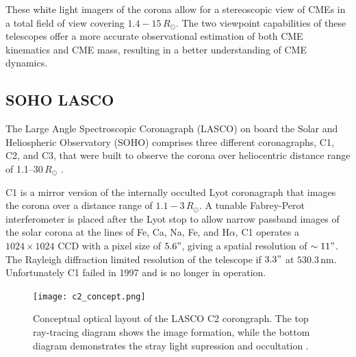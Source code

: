 These white light imagers of the corona allow for a stereoscopic view of CMEs in a total field of view covering $1.4 - 15\,R_{\odot}$. The two viewpoint capabilities of these telescopes offer a more accurate observational estimation of both CME kinematics and CME mass, resulting in a better understanding of CME dynamics.

\subsection{SOHO LASCO}\label{sec:23}

The Large Angle Spectroscopic Coronagraph (LASCO) on board the Solar and Heliospheric Observatory (SOHO) comprises three different coronagraphs, C1, C2, and C3, that were built to observe the corona over heliocentric distance range of 1.1--30\,$R_{\odot}$ \citep{bru95}. 

C1 is a mirror version of the internally occulted Lyot coronagraph that images the corona over a distance range of $1.1- 3\,R_{\odot}$. A tunable Fabrey-Perot interferometer is placed after the Lyot stop to allow narrow passband images of the solar corona at the lines of Fe, Ca, Na, Fe, and H$\alpha$,
C1 operates a $1024\times1024$ CCD with a pixel size of $5.6"$, giving a spatial resolution of $\sim11"$. The Rayleigh diffraction limited resolution of the telescope if $3.3"$ at $530.3$\,nm. Unfortunately C1 failed in 1997 and is no longer in operation. 
\begin{figure}[!t]
\begin{center}
\texttt{[image: c2\_concept.png]}
\caption[The LASCO C2 coronagraph optics]{Conceptual optical layout of the LASCO C2 corongraph. The top ray-tracing diagram shows the image formation, while the bottom diagram demonstrates the stray light supression and occultation \citep{bru95}.}
\label{fig:c2_concept}
\end{center}
\end{figure}

